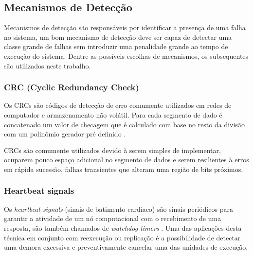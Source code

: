 \subsection{Mecanismos de Detecção}

Mecanismos de detecção são responsáveis por identificar a presença de uma falha no sistema, um bom mecanismo de detecção deve ser capaz de detectar uma classe grande de falhas sem introduzir uma penalidade grande ao tempo de execução do sistema. Dentre as possíveis escolhas de mecanismos, os subsequentes são utilizados neste trabalho.

\subsubsection{CRC (Cyclic Redundancy Check)}

Os CRCs são códigos de detecção de erro comumente utilizados em redes de computador e armazenamento não volátil. Para cada segmento de dado é concatenado um valor de checagem que é calculado com base no resto da divisão com um polinômio gerador pré definido \cite{FaultTolerantSystems}.

CRCs são comumente utilizados devido à serem simples de implementar, ocuparem pouco espaço adicional no segmento de dados e serem resilientes à erros em rápida sucessão, falhas transientes que alteram uma região de bits próximos.

\subsubsection{Heartbeat signals}

Os \textit{heartbeat signals} (sinais de batimento cardíaco) são sinais periódicos para garantir a atividade de um nó computacional com o recebimento de uma resposta, são também chamados de \textit{watchdog timers} \cite{DependabilityInEmbeddedSystems}. Uma das aplicações desta técnica em conjunto com reexecução ou replicação é a possibilidade de detectar uma demora excessiva e preventivamente cancelar uma das unidades de execução.

